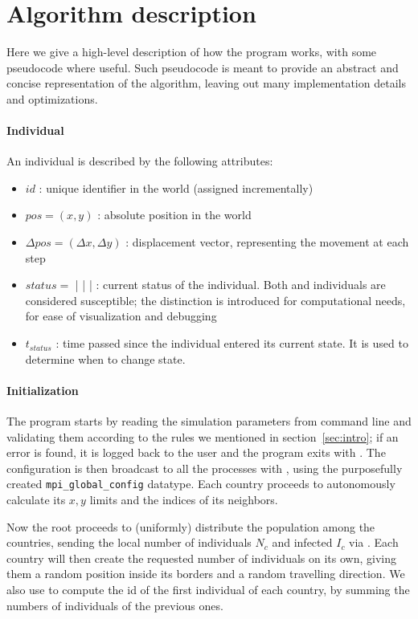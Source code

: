\section{Algorithm description}
\label{sec:alg_desc}

Here we give a high-level description of how the program works, with some pseudocode where useful. Such pseudocode is meant to provide an abstract and concise representation of the algorithm, leaving out many implementation details and optimizations.

\paragraph{Individual}
An individual is described by the following attributes:
\begin{itemize}
    \item $id$ : unique identifier in the world (assigned incrementally)
    \item $pos = (x,y)$ : absolute position in the world
    \item $\Delta pos = (\Delta x,\Delta y)$ : displacement vector, representing the movement at each step
    \item $status =$ \NotExposed | \Exposed | \Infected | \Immune : current status of the individual. Both \NotExposed and \Exposed individuals are considered susceptible; the distinction is introduced for computational needs, for ease of visualization and debugging
    \item $t_{status}$ : time passed since the individual entered its current state. It is used to determine when to change state.
\end{itemize}

\paragraph{Initialization}
The program starts by reading the simulation parameters from command line and validating them according to the rules we mentioned in section~\ref{sec:intro}; if an error is found, it is logged back to the user and the program exits with \MPIAbort.
The configuration is then broadcast to all the processes with \MPIBcast, using the purposefully created \texttt{mpi\_global\_config} datatype.
Each country proceeds to autonomously calculate its $x,y$ limits and the indices of its neighbors.

Now the root proceeds to (uniformly) distribute the population among the countries, sending the local number of individuals $N_c$ and infected $I_c$ via \MPIScatter. Each country will then create the requested number of individuals on its own, giving them a random position inside its borders and a random travelling direction.
We also use \MPIExscan to compute the id of the first individual of each country, by summing the numbers of individuals of the previous ones.

